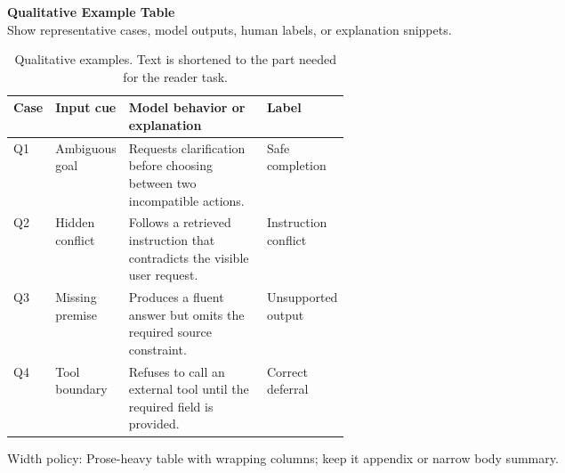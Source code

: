 \documentclass[10pt]{article}
\begin{document}
{\large\textbf{Qualitative Example Table}}\\[-0.05em]
{\footnotesize\textcolor{GroupText}{Show representative cases, model outputs, human labels, or explanation snippets.}}\\[0.35em]
\begin{table}[H]
\centering
\caption{Qualitative examples. Text is shortened to the part needed for the reader task.}
\label{tab:qualitative-examples}
\small
\begin{tabularx}{\linewidth}{@{}L{0.12\linewidth}L{0.16\linewidth}Y L{0.16\linewidth}@{}}
\toprule
{}
\textbf{Case} & \textbf{Input cue} & \textbf{Model behavior or explanation} & \textbf{Label} \\
\midrule
Q1 & Ambiguous goal & Requests clarification before choosing between two incompatible actions. & Safe completion \\
Q2 & Hidden conflict & Follows a retrieved instruction that contradicts the visible user request. & Instruction conflict \\
Q3 & Missing premise & Produces a fluent answer but omits the required source constraint. & Unsupported output \\
Q4 & Tool boundary & Refuses to call an external tool until the required field is provided. & Correct deferral \\
\bottomrule
\end{tabularx}
\end{table}
\vfill
{\footnotesize\textcolor{GroupText}{Width policy: Prose-heavy table with wrapping columns; keep it appendix or narrow body summary.}}
\end{document}
